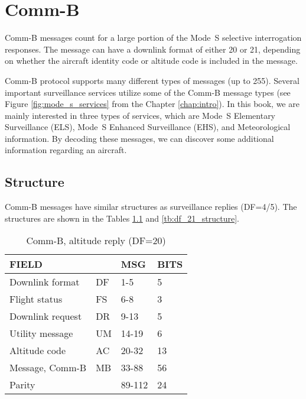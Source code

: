 \chapter{Comm-B} \label{chap:comm-b}

Comm-B messages count for a large portion of the Mode~S selective interrogation responses. The message can have a downlink format of either 20 or 21, depending on whether the aircraft identity code or altitude code is included in the message.

Comm-B protocol supports many different types of messages (up to 255). Several important surveillance services utilize some of the Comm-B message types (see Figure \ref{fig:mode_s_services} from the Chapter \ref{chap:intro}). In this book, we are mainly interested in three types of services, which are Mode~S Elementary Surveillance (ELS), Mode~S Enhanced Surveillance (EHS), and Meteorological information. By decoding these messages, we can discover some additional information regarding an aircraft.


\section{Structure}

Comm-B messages have similar structures as surveillance replies (DF=4/5). The structures are shown in the Tables \ref{tb:df_20_structure} and \ref{tb:df_21_structure}.

\begin{table}[!ht]
  \centering
  \caption{Comm-B, altitude reply (DF=20)}
  \label{tb:df_20_structure}
  \begin{tabular}[t]{|l|l|l|l|}
  \hline
  \textbf{FIELD} & \textbf{} & \textbf{MSG} & \textbf{BITS} \\ \hline
  Downlink format         & DF & 1-5    & 5   \\ \hline
  Flight status           & FS & 6-8    & 3   \\ \hline
  Downlink request        & DR & 9-13   & 5   \\ \hline
  Utility message         & UM & 14-19  & 6   \\ \hline
  Altitude code           & AC & 20-32  & 13  \\ \hline
  Message, Comm-B         & MB & 33-88  & 56  \\ \hline
  Parity  &  & 89-112  & 24  \\ \hline
  \end{tabular}
\end{table}


